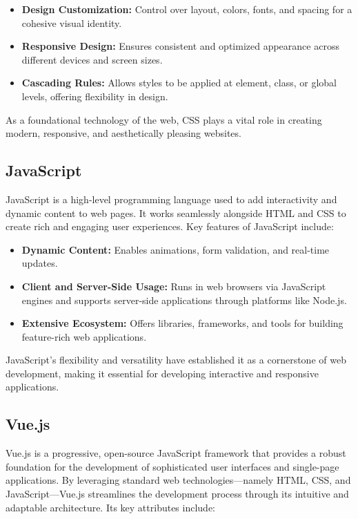 \begin{itemize}
    \item \textbf{Design Customization:} Control over layout, colors, fonts, and spacing for a cohesive visual identity.
    \item \textbf{Responsive Design:} Ensures consistent and optimized appearance across different devices and screen sizes.
    \item \textbf{Cascading Rules:} Allows styles to be applied at element, class, or global levels, offering flexibility in design.
\end{itemize}

As a foundational technology of the web, CSS plays a vital role in creating modern, responsive, and aesthetically pleasing websites.

\cite{CSS-Wikipedia}

\subsection{JavaScript}

JavaScript is a high-level programming language used to add interactivity and dynamic content to web pages. It works seamlessly alongside HTML and CSS to create rich and engaging user experiences. Key features of JavaScript include:

\begin{itemize}
    \item \textbf{Dynamic Content:} Enables animations, form validation, and real-time updates.
    \item \textbf{Client and Server-Side Usage:} Runs in web browsers via JavaScript engines and supports server-side applications through platforms like Node.js.
    \item \textbf{Extensive Ecosystem:} Offers libraries, frameworks, and tools for building feature-rich web applications.
\end{itemize}

JavaScript’s flexibility and versatility have established it as a cornerstone of web development, making it essential for developing interactive and responsive applications.

\cite{JavaScript-Wikipedia}

\subsection{Vue.js}

Vue.js is a progressive, open-source JavaScript framework that provides a robust foundation for the development of sophisticated user interfaces and single-page applications. By leveraging standard web technologies—namely HTML, CSS, and JavaScript—Vue.js streamlines the development process through its intuitive and adaptable architecture. Its key attributes include:

